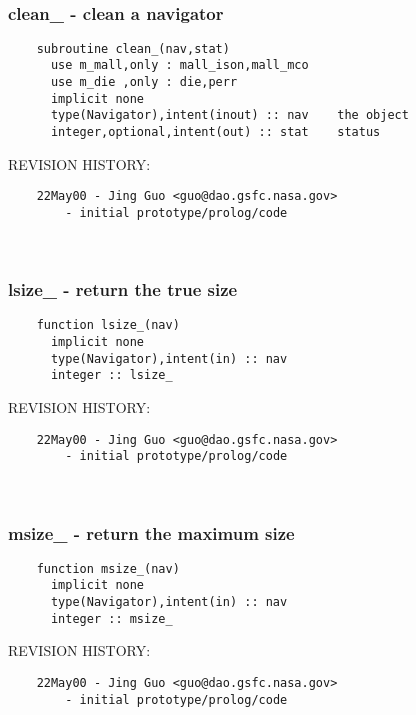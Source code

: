  
\mbox{}\hrulefill\ 
 

 \subsubsection{clean\_ - clean a navigator}


 
 
\begin{verbatim} 
    subroutine clean_(nav,stat)
      use m_mall,only : mall_ison,mall_mco
      use m_die ,only : die,perr
      implicit none
      type(Navigator),intent(inout) :: nav	  the object
      integer,optional,intent(out) :: stat	  status
 \end{verbatim}{\sf REVISION HISTORY:}
\begin{verbatim}  	22May00	- Jing Guo <guo@dao.gsfc.nasa.gov>
 		- initial prototype/prolog/code\end{verbatim}
 
 
\mbox{}\hrulefill\ 
 

 \subsubsection{lsize\_ - return the true size}


 
 
\begin{verbatim} 
    function lsize_(nav)
      implicit none
      type(Navigator),intent(in) :: nav
      integer :: lsize_
 \end{verbatim}{\sf REVISION HISTORY:}
\begin{verbatim}  	22May00	- Jing Guo <guo@dao.gsfc.nasa.gov>
 		- initial prototype/prolog/code\end{verbatim}
 
 
\mbox{}\hrulefill\ 
 

 \subsubsection{msize\_ - return the maximum size}


 
 
\begin{verbatim} 
    function msize_(nav)
      implicit none
      type(Navigator),intent(in) :: nav
      integer :: msize_
 \end{verbatim}{\sf REVISION HISTORY:}
\begin{verbatim}  	22May00	- Jing Guo <guo@dao.gsfc.nasa.gov>
 		- initial prototype/prolog/code\end{verbatim}
 

